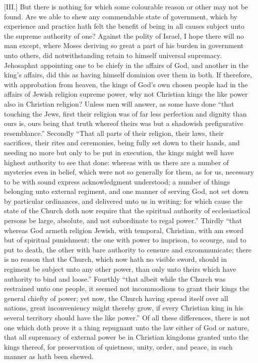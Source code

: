 [III.] But there is nothing for which some colourable reason or other may not be found. Are we able to shew any commendable state of government, which by experience and practice hath felt the benefit of being in all causes subject unto the supreme authority of one? Against the polity of  Israel, I hope there will no man except, where Moses deriving so great a part of his burden in government unto others, did notwithstanding retain to himself universal supremacy. Jehosaphat appointing one to be chiefy in the affairs of God, and another in the king’s affairs, did this as having himself dominion over them in both. If therefore, with approbation from heaven, the kings of God’s own chosen people had in the affairs of Jewish religion supreme power, why not Christian kings the like power also in Christian religion? Unless men will answer, as some have done “that touching the Jews, first their religion was of far less perfection and dignity than ours is, ours being that truth whereof theirs was but a shadowish prefigurative resemblance.” Secondly “That all parts of their religion, their laws, their sacrifices, their rites and ceremonies, being fully set down to their hands, and needing no more but only to be put in execution, the kings might well have highest authority to see that done: whereas with us there are a number of mysteries even in belief, which were not so generally for them, as for us, necessary to be with sound express acknowledgment understood; a number of things belonging unto external regiment, and one manner of serving God, not set down by particular ordinances, and  delivered unto us in writing; for which cause the state of the Church doth now require that the spiritual authority of ecclesiastical persons be large, absolute, and not subordinate to regal power.” Thirdly “that whereas God armeth religion Jewish, with temporal, Christian, with am sword but of spiritual punishment; the one with power to imprison, to scourge, and to put to death, the other with bare authority to censure and excommunicate; there is no reason that the Church, which now hath no visible sword, should in regiment be subject unto any other power, than only unto theirs which have authority to bind and loose.” Fourthly “that albeit while the Church was restrained unto one people, it seemed not incommodious to grant their kings the general chiefty of power; yet now, the Church having spread itself over all nations, great inconveniency might thereby grow, if every Christian king in his several territory should have the like power.” Of all these differences, there is not one which doth prove it a thing repugnant unto the law either of God or nature, that all supremacy of external power be in Christian kingdoms granted unto the kings thereof, for preservation of quietness, unity, order, and peace, in such manner as hath been shewed.


